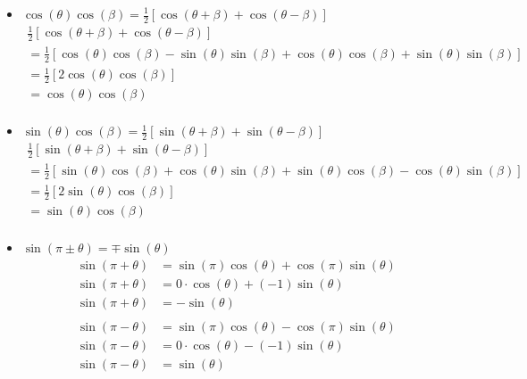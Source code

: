 \documentclass[12pt]{article}
\begin{document}
\begin{itemize}
    \item $\cos(\theta) \cos(\beta) = \frac{1}{2}[\cos(\theta + \beta) + \cos(\theta - \beta)]$
        \begin{gather*}
            \frac{1}{2}[\cos(\theta + \beta) + \cos(\theta - \beta)] \\
            =\frac{1}{2}[\cos(\theta)\cos(\beta) - \sin(\theta)\sin(\beta) + \cos(\theta)\cos(\beta) + \sin(\theta)\sin(\beta)] \\
            =\frac{1}{2}[2\cos(\theta)\cos(\beta)] \\
            =\cos(\theta)\cos(\beta) \tag*{$\square$} \\
        \end{gather*}
    \item $\sin(\theta) \cos(\beta) = \frac{1}{2}[\sin(\theta + \beta) + \sin(\theta - \beta)]$
        \begin{gather*}
            \frac{1}{2}[\sin(\theta + \beta) + \sin(\theta - \beta)] \\
            =\frac{1}{2}[\sin(\theta)\cos(\beta) + \cos(\theta)\sin(\beta) + \sin(\theta)\cos(\beta) - \cos(\theta)\sin(\beta)] \\
            =\frac{1}{2}[2\sin(\theta)\cos(\beta)] \\
            =\sin(\theta)\cos(\beta) \tag*{$\square$} \\
        \end{gather*}

    \item $\sin(\pi \pm \theta) = \mp \sin(\theta)$
        \begin{align*}
            \sin(\pi + \theta) &= \sin(\pi)\cos(\theta) + \cos(\pi)\sin(\theta) \\
            \sin(\pi + \theta) &= 0 \cdot \cos(\theta) + (-1)\sin(\theta) \\
            \sin(\pi + \theta) &= -\sin(\theta) \tag*{$\square$} \\ \\
            \sin(\pi - \theta) &= \sin(\pi)\cos(\theta) - \cos(\pi)\sin(\theta) \\
            \sin(\pi - \theta) &= 0 \cdot \cos(\theta) - (-1)\sin(\theta) \\
            \sin(\pi - \theta) &=  \sin(\theta)  \tag*{$\square$}
        \end{align*}


\end{itemize}
\end{document}
